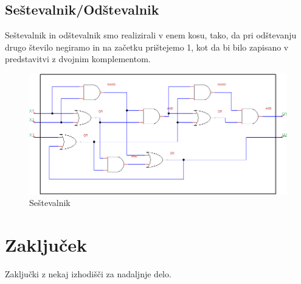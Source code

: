 \documentclass[seminar, slovene]{FRIreport}
\begin{document}
\subsection{Seštevalnik/Odštevalnik}
Seštevalnik in odštevalnik smo realizirali v enem kosu, tako, da pri odštevanju drugo število negiramo in na začetku prištejemo 1, kot da bi bilo zapisano v predstavitvi z dvojnim komplementom.
\begin{figure}[htb]
\includegraphics[width=14cm]{vezja/img/sestevalnik.png}
\caption{Seštevalnik}
\label{sestevalnik}
\end{figure}
\pagebreak

%
\section{Zaključek}
Zaključki z nekaj izhodišči za nadaljnje delo.

%
\References


\end{document}
